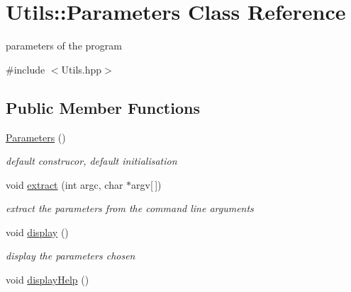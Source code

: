 \hypertarget{classUtils_1_1Parameters}{}\section{Utils\+:\+:Parameters Class Reference}
\label{classUtils_1_1Parameters}


parameters of the program  




{\ttfamily \#include $<$Utils.\+hpp$>$}

\subsection*{Public Member Functions}
\begin{DoxyCompactItemize}
\item 
\hyperlink{classUtils_1_1Parameters_a168ba95a83d2fc55e054274bf1a69e6f}{Parameters} ()\hypertarget{classUtils_1_1Parameters_a168ba95a83d2fc55e054274bf1a69e6f}{}\label{classUtils_1_1Parameters_a168ba95a83d2fc55e054274bf1a69e6f}

\begin{DoxyCompactList}\small\item\em default construcor, default initialisation \end{DoxyCompactList}\item 
void \hyperlink{classUtils_1_1Parameters_af21165d8ea068ab8af22b34b732a2704}{extract} (int argc, char $\ast$argv\mbox{[}$\,$\mbox{]})
\begin{DoxyCompactList}\small\item\em extract the parameters from the command line arguments \end{DoxyCompactList}\item 
void \hyperlink{classUtils_1_1Parameters_a213b54e1dd8baefd3dc3af9bfd0a0764}{display} ()\hypertarget{classUtils_1_1Parameters_a213b54e1dd8baefd3dc3af9bfd0a0764}{}\label{classUtils_1_1Parameters_a213b54e1dd8baefd3dc3af9bfd0a0764}

\begin{DoxyCompactList}\small\item\em display the parameters chosen \end{DoxyCompactList}\item 
void \hyperlink{classUtils_1_1Parameters_a51a1ddc6b2b9d6d4a921bb2a64d8fdaf}{display\+Help} ()\hypertarget{classUtils_1_1Parameters_a51a1ddc6b2b9d6d4a921bb2a64d8fdaf}{}\label{classUtils_1_1Parameters_a51a1ddc6b2b9d6d4a921bb2a64d8fdaf}


\end{DoxyCompactItemize}
